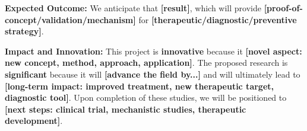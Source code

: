 \documentclass[11pt,letterpaper]{article}
\begin{document}
\textbf{Expected Outcome:} We anticipate that \textbf{[result]}, which will provide \textbf{[proof-of-concept/validation/mechanism]} for \textbf{[therapeutic/diagnostic/preventive strategy]}.

\vspace{0.3cm}



\textbf{Impact and Innovation:} This project is \textbf{innovative} because it \textbf{[novel aspect: new concept, method, approach, application]}. The proposed research is \textbf{significant} because it will \textbf{[advance the field by...]} and will ultimately lead to \textbf{[long-term impact: improved treatment, new therapeutic target, diagnostic tool]}. Upon completion of these studies, we will be positioned to \textbf{[next steps: clinical trial, mechanistic studies, therapeutic development]}.

\vspace{0.5cm}


\end{document}
